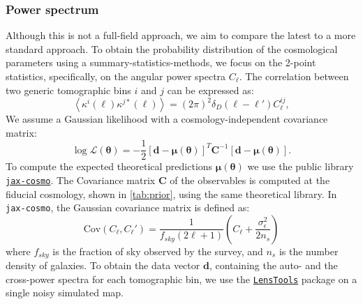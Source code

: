 \documentclass{aa}
\begin{document}
\subsubsection{Power spectrum}
Although this is not a full-field approach, we aim to compare the latest to a more standard approach. 
To obtain the probability distribution of the cosmological parameters using a summary-statistics-methods, we focus on the 2-point statistics, specifically, on the angular power spectra $C_{\ell}$.
The correlation between two generic tomographic bins $i$ and $j$ can be expressed as:
\begin{equation}
    \left \langle \kappa^{i}(\ell)\kappa^{j*}(\ell)\right \rangle =(2\pi)^2\delta_D(\ell-\ell')C_{\ell}^{ij},
\end{equation}
We assume a Gaussian likelihood with a cosmology-independent covariance matrix:
\begin{equation}
    \log{\mathcal{L}}(\bm{\theta})=-\frac{1}{2}[\bm{d}-\bm{\mu}(\bm{\theta})]^{T}\bm{C}^{-1}[\bm{d}-\bm{\mu}(\bm{\theta})].
\end{equation}
To compute the expected theoretical predictions $\bm{\mu}(\bm{\theta})$ we use the public library \href{https://github.com/DifferentiableUniverseInitiative/jax_cosmo}{\texttt{jax-cosmo}}. 
 The Covariance matrix $\bm{C}$ of the observables is computed at the fiducial cosmology, shown in \autoref{tab:prior}, using the same theoretical library. In {\texttt{jax-cosmo}}, the Gaussian covariance matrix is defined as:
\begin{equation}
    \text{Cov}(C_{\ell},C_{\ell}')=\frac{1}{f_{sky}(2 \ell+1)}\left(C_{\ell}+\frac{\sigma_{\epsilon}^2}{2n_s}\right)
\end{equation}
where $f_{sky}$ is the fraction of sky observed by the survey, and $n_s$ is the number density of galaxies. 
To obtain the data vector $\bm{d}$, containing the auto- and the cross-power spectra for each tomographic bin, we use the \href{https://lenstools.readthedocs.io/en/latest/lenstool} {\texttt{LensTools}} package \citep{2016A&C....17...73P} on a single noisy simulated map. 
\end{document}
